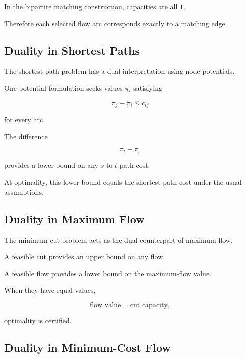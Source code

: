 In the bipartite matching construction, capacities are all \(1\).

Therefore each selected flow arc corresponds exactly to a matching edge.

\subsection{Duality in Shortest Paths}
\label{subsec:shortest-path-duality}

The shortest-path problem has a dual interpretation using node potentials.

One potential formulation seeks values \(\pi_i\) satisfying

\[
\boxed{
\pi_j-\pi_i
\leq
c_{ij}
}
\]

for every arc.

The difference

\[
\pi_t-\pi_s
\]

provides a lower bound on any \(s\)-to-\(t\) path cost.

At optimality, this lower bound equals the shortest-path cost under the
usual assumptions.

\subsection{Duality in Maximum Flow}
\label{subsec:max-flow-duality}

The minimum-cut problem acts as the dual counterpart of maximum flow.

A feasible cut provides an upper bound on any flow.

A feasible flow provides a lower bound on the maximum-flow value.

When they have equal values,

\[
\boxed{
\text{flow value}
=
\text{cut capacity},
}
\]

optimality is certified.

\subsection{Duality in Minimum-Cost Flow}
\label{subsec:min-cost-flow-duality}


